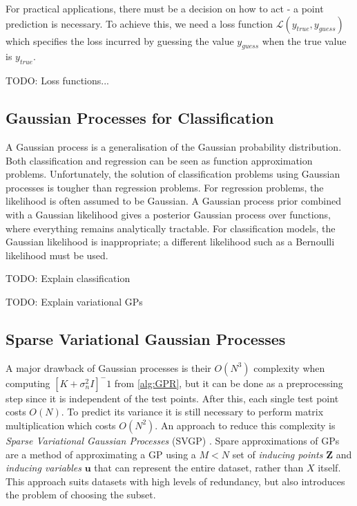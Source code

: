 \documentclass[12pt,a4paper]{report}
\theoremstyle{definition}
\begin{document}
For practical applications, there must be a decision on how to act - a point prediction is necessary. 
To achieve this, we need a loss function $\mathcal{L}(y_{true}, y_{guess})$ which specifies the loss incurred by guessing the value $y_{guess}$ when the true value is $y_{true}$. 

TODO: Loss functions...

\subsection{Gaussian Processes for Classification}

A Gaussian process is a generalisation of the Gaussian probability distribution. 
Both classification and regression can be seen as function approximation problems. 
Unfortunately, the solution of classification problems using Gaussian processes is tougher than regression problems. 
For regression problems, the likelihood is often assumed to be Gaussian. 
A Gaussian process prior combined with a Gaussian likelihood gives a posterior Gaussian process over functions, where everything remains analytically tractable. 
For classification models, the Gaussian likelihood is inappropriate; a different likelihood such as a Bernoulli likelihood must be used.

TODO: Explain classification

TODO: Explain variational GPs

\subsection{Sparse Variational Gaussian Processes}

A major drawback of Gaussian processes is their $O(N^3)$ complexity when computing $[K + \sigma_{n}^2I]^-1$ from \ref{alg:GPR}, but it can be done as a preprocessing step since it is independent of the test points. 
After this, each single test point costs $O(N)$. 
To predict its variance it is still necessary to perform matrix multiplication which costs $O(N^2)$.
An approach to reduce this complexity is \emph{Sparse Variational Gaussian Processes} (SVGP) \citep{Hensman2014}.
Spare approximations of GPs are a method of approximating a GP using a $M < N$ set of \emph{inducing points} $\textbf{Z}$ and \emph{inducing variables} $\textbf{u}$ that can represent the entire dataset, rather than $X$ itself. 
This approach suits datasets with high levels of redundancy, but also introduces the problem of choosing the subset.
\end{document}
